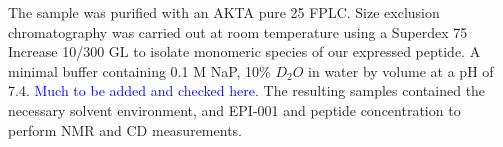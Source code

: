 The sample was purified with an AKTA pure 25 FPLC. 
Size exclusion chromatography was carried out at room temperature using a Superdex 75 Increase 10/300 GL to isolate monomeric species of our expressed peptide. 
A minimal buffer containing 0.1 M NaP, 10\% $D_2O$ in water by volume at a pH of 7.4. \textcolor{blue}{Much to be added and checked here. }
The resulting samples contained the necessary solvent environment, and EPI-001 and peptide concentration to perform NMR and CD measurements. 